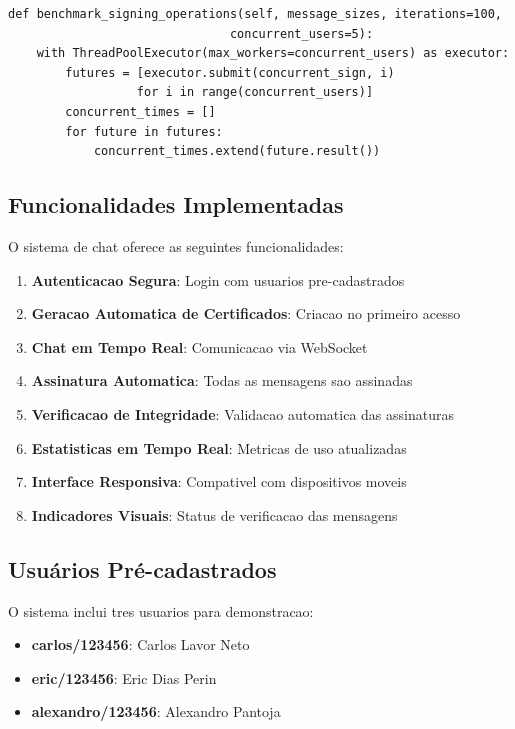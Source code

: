 \documentclass[12pt,a4paper,oneside]{article}
\begin{document}
\begin{lstlisting}[caption=Benchmark de operações concorrentes]
def benchmark_signing_operations(self, message_sizes, iterations=100, 
                               concurrent_users=5):
    with ThreadPoolExecutor(max_workers=concurrent_users) as executor:
        futures = [executor.submit(concurrent_sign, i) 
                  for i in range(concurrent_users)]
        concurrent_times = []
        for future in futures:
            concurrent_times.extend(future.result())
\end{lstlisting}

\subsection{Funcionalidades Implementadas}

O sistema de chat oferece as seguintes funcionalidades:

\begin{enumerate}
    \item \textbf{Autenticacao Segura}: Login com usuarios pre-cadastrados
    \item \textbf{Geracao Automatica de Certificados}: Criacao no primeiro acesso
    \item \textbf{Chat em Tempo Real}: Comunicacao via WebSocket
    \item \textbf{Assinatura Automatica}: Todas as mensagens sao assinadas
    \item \textbf{Verificacao de Integridade}: Validacao automatica das assinaturas
    \item \textbf{Estatisticas em Tempo Real}: Metricas de uso atualizadas
    \item \textbf{Interface Responsiva}: Compativel com dispositivos moveis
    \item \textbf{Indicadores Visuais}: Status de verificacao das mensagens
\end{enumerate}

\subsection{Usuários Pré-cadastrados}

O sistema inclui tres usuarios para demonstracao:

\begin{itemize}
    \item \textbf{carlos/123456}: Carlos Lavor Neto
    \item \textbf{eric/123456}: Eric Dias Perin
    \item \textbf{alexandro/123456}: Alexandro Pantoja
\end{itemize}
\end{document}
